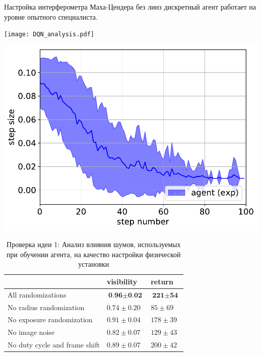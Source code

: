 \begin{frame}[allowframebreaks]{Настройка интерферометра Маха-Цендера без линз}
 дискретный агент работает на уровне опытного специалиста.

\framebreak
\begin{minipage}{\textwidth}
\texttt{[image: DQN\_analysis.pdf]}
\end{minipage}
\begin{minipage}{\textwidth}
\includegraphics[width=0.5\linewidth]{images/agent_step_size.pdf}
\end{minipage}

\framebreak 

\begin{table} [htbp]
    \centering
    \begin{threeparttable}
        \caption*{{\color{orange} Проверка идеи 1:} Анализ влияния шумов, используемых при обучении агента, на качество настройки физической установки}
        \begin{tabular}{| p{5cm} || p{2cm} || p{2cm} |}
            \hline
            \hline
             & visibility & return \\
            \hline
            All randomizations  & $\textbf{0.96} \pm \textbf{0.02}$ & $\textbf{221} \pm \textbf{54}$ \\
            No radius randomization & $0.74 \pm 0.20$ & $85 \pm 69$ \\
            No exposure randomization& $0.91 \pm 0.04$ & $178 \pm 39$ \\
            No image noise & $0.82 \pm 0.07$ & $129 \pm 43$ \\
            No duty cycle and frame shift  &  $0.89 \pm 0.07$ & $200 \pm 42$ \\
            \hline
            \hline
        \end{tabular}
    \end{threeparttable}
\end{table}
\end{frame}

